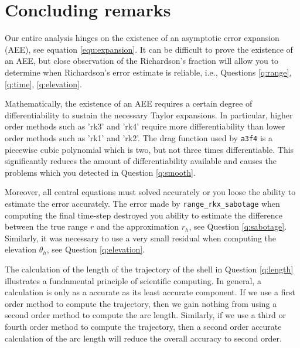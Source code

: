 \documentclass[a4paper,12pt]{article}
\newcounter{problem}
\newcounter{remark}
\begin{document}
\section{Concluding remarks}

Our entire analysis hinges on the existence of an asymptotic error expansion (AEE), see equation \eqref{equ:expansion}. It can be difficult to prove the existence of an AEE, but close observation of the Richardson's fraction will allow you to determine when Richardson's error estimate is reliable, i.e., Questions \ref{q:range}, \ref{q:time}, \ref{q:elevation}.

Mathematically, the existence of an AEE requires a certain degree of differentiability to sustain the necessary Taylor expansions. In particular, higher order methods such as 'rk3' and 'rk4' require more differentiability than lower order methods such as 'rk1' and 'rk2'. The drag function used by {\tt a3f4} is a piecewise cubic polynomial which is two, but not three times differentiable. This significantly reduces the amount of differentiability available and causes the problems which you detected in Question \ref{q:smooth}.

Moreover, all central equations must solved accurately or you loose the ability to estimate the error accurately. The error made by {\tt range\_rkx\_sabotage} when computing the final time-step destroyed you ability to estimate the difference between the true range $r$ and the approximation $r_h$, see Question \ref{q:sabotage}. Similarly, it was necessary to use a very small residual when computing the elevation $\theta_h$, see Question \ref{q:elevation}.

The calculation of the length of the trajectory of the shell in Question \ref{q:length} illustrates a fundamental principle of scientific computing. In general, a calculation is only as a accurate as its least accurate component. If we use a first order method to compute the trajectory, then we gain nothing from using a second order method to compute the arc length. Similarly, if we use a third or fourth order method to compute the trajectory, then a second order accurate calculation of the arc length will reduce the overall accuracy to second order.
\end{document}
